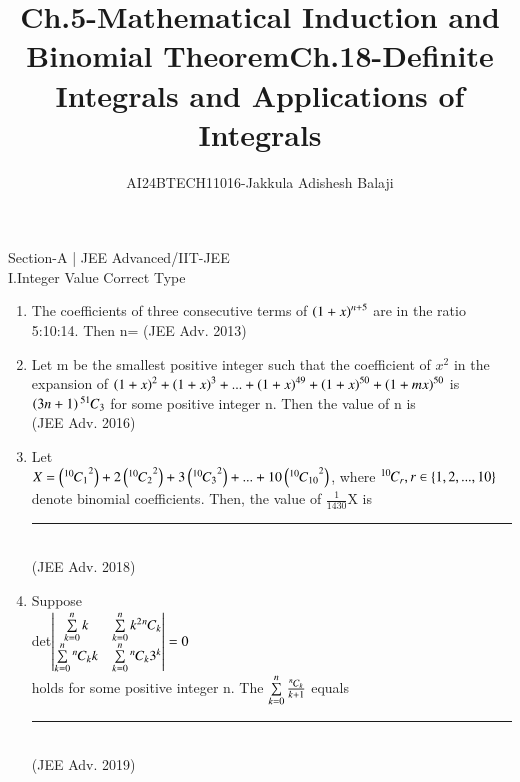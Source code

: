 \documentclass[journal]{IEEEtran}
\begin{document}

\title{Ch.5-Mathematical Induction and Binomial Theorem}
\author{AI24BTECH11016-Jakkula Adishesh Balaji}
{\let\newpage\relax\maketitle}
\renewcommand{\thefigure}{\theenumi}
\renewcommand{\thetable}{\theenumi}
\setlength{\intextsep}{10pt} %
\renewcommand{\thetable}{\theenumi}
Section-A | JEE Advanced/IIT-JEE\\
 I.Integer Value Correct Type
\begin{enumerate}
        \item
            The coefficients of three consecutive terms of $\left(1+x\right)^{n+5}$ are in the ratio 5:10:14. Then n=       
                     \hfill(JEE Adv. 2013)
        \item
            Let m be the smallest positive integer such that the coefficient of $x^{2}$ in the expansion of $\left(1+x\right)^{2} + \left(1+x\right)^{3} + ... + \left(1+x\right)^{49} + \left(1+x\right)^{50} + \left(1+mx\right)^{50}$ is $\left(3n+1\right) {{}^{51}\mkern-1muC_{3}}$ for some positive integer n. Then the value of n is \\
                     \hfill(JEE Adv. 2016)
        \item
            Let \\ $X= \left({{}^{10}\mkern-1muC_{1}}^{2}\right)+2\left({{}^{10}\mkern-1muC_{2}}^{2}\right) + 3\left({{}^{10}\mkern-1muC_{3}}^{2}\right) + ... + 10\left({{}^{10}\mkern-1muC_{10}}^{2}\right)$, where ${{}^{10}\mkern-1muC_{r}} , r \in \left\{1,2,...,10\right\}$ denote binomial coefficients. Then, the value of $\frac{1}{1430}$X is \rule{10mm}{0.15mm} \\
                    \hfill(JEE Adv. 2018)
        \item
        Suppose \\
           det$\begin{vmatrix} \sum\limits_{k=0}^{n}k & \sum\limits_{k=0}^{n} k^{2} {{}^{n}\mkern-1muC_{k}} \\ \sum\limits_{k=0}^{n}{{}^{n}\mkern-1muC_{k}} k & \sum\limits_{k=0}^{n}{{}^{n}\mkern-1muC_{k}} 3^{k}\end{vmatrix}=0$ \\
holds for some positive integer n. The $\sum\limits_{k=0}^{n} \frac{{{}^{n}\mkern-1muC_{k}}}{k+1}$ equals \rule{10mm}{0.15mm} \\
                    \hfill(JEE Adv. 2019)
\end{enumerate}
\newpage
\title{Ch.18-Definite Integrals and Applications of Integrals}
\maketitle
\end{document}
